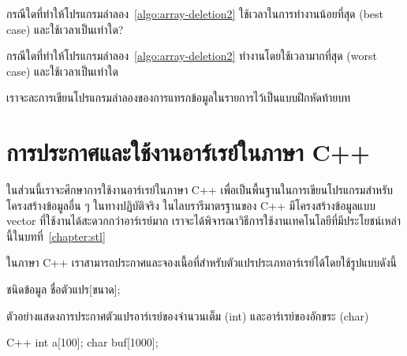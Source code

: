 \begin{quiz}{}
กรณี{\wbr}ใด{\wbr}ที่{\wbr}ทำให้{\wbr}โปรแกรม{\wbr}ลำลอง~\ref{algo:array-deletion2}
ใช้{\wbr}เวลา{\wbr}ใน{\wbr}การ{\wbr}ทำงาน{\wbr}น้อย{\wbr}ที่สุด (best case) และ{\wbr}ใช้{\wbr}เวลา{\wbr}เป็น{\wbr}เท่าใด?
\end{quiz}

\begin{quiz}{}
กรณี{\wbr}ใด{\wbr}ที่{\wbr}ทำให้{\wbr}โปรแกรม{\wbr}ลำลอง~\ref{algo:array-deletion2} ทำงาน{\wbr}โดย{\wbr}ใช้{\wbr}เวลา{\wbr}มาก{\wbr}ที่สุด (worst case)  และ{\wbr}ใช้{\wbr}เวลา{\wbr}เป็น{\wbr}เท่าใด{\wbr}
\end{quiz}

เรา{\wbr}จะ{\wbr}ละ{\wbr}การ{\wbr}เขียน{\wbr}โปรแกรม{\wbr}ลำลอง{\wbr}ของ{\wbr}การ{\wbr}แทรก{\wbr}ข้อมูล{\wbr}ใน{\wbr}รายการ{\wbr}ไว้{\wbr}เป็น{\wbr}แบบฝึกหัด{\wbr}ท้าย{\wbr}บท{\wbr}

\section{การ{\wbr}ประกาศ{\wbr}และ{\wbr}ใช้งาน{\wbr}อาร์{\wbr}เรย์{\wbr}ใน{\wbr}ภาษา C++}
ใน{\wbr}ส่วน{\wbr}นี้{\wbr}เรา{\wbr}จะ{\wbr}ศึกษา{\wbr}การ{\wbr}ใช้งาน{\wbr}อาร์{\wbr}เรย์{\wbr}ใน{\wbr}ภาษา C++ เพื่อ{\wbr}เป็น{\wbr}พื้นฐาน{\wbr}ใน{\wbr}การ{\wbr}เขียน{\wbr}โปรแกรม{\wbr}สำหรับ{\wbr}โครงสร้าง{\wbr}ข้อมูล{\wbr}อื่น ๆ 
ใน{\wbr}ทาง{\wbr}ปฏิบัติ{\wbr}จริง ใน{\wbr}ไลบรารี{\wbr}มาตรฐาน{\wbr}ของ C++ มี{\wbr}โครงสร้าง{\wbr}ข้อมูล{\wbr}แบบ {\ct vector}
ที่{\wbr}ใช้งาน{\wbr}ได้{\wbr}สะดวก{\wbr}กว่า{\wbr}อาร์{\wbr}เรย์{\wbr}มาก{\wbr}
เรา{\wbr}จะ{\wbr}ได้{\wbr}พิจารณา{\wbr}วิธีการ{\wbr}ใช้งาน{\wbr}เทคโนโลยี{\wbr}ที่{\wbr}มี{\wbr}ประโยชน์{\wbr}เหล่า{\wbr}นี้{\wbr}ใน{\wbr}บท{\wbr}ที่~\ref{chapter:stl}

ใน{\wbr}ภาษา C++
เรา{\wbr}สามารถ{\wbr}ประกาศ{\wbr}และ{\wbr}จอง{\wbr}เนื้อที่{\wbr}สำหรับ{\wbr}ตัวแปร{\wbr}ประเภท{\wbr}อาร์{\wbr}เรย์{\wbr}ได้{\wbr}โดย{\wbr}ใช้{\wbr}รูปแบบ{\wbr}ดังนี้{\wbr}

\begin{center}
ชนิด{\wbr}ข้อมูล ชื่อ{\wbr}ตัวแปร[ขนาด];
\end{center}

ตัวอย่าง{\wbr}แสดง{\wbr}การ{\wbr}ประกาศ{\wbr}ตัวแปร{\wbr}อาร์{\wbr}เรย์{\wbr}ของ{\wbr}จำนวน{\wbr}เต็ม ({\ct int})
และ{\wbr}อาร์{\wbr}เรย์{\wbr}ของ{\wbr}อักขระ ({\ct char})

\latintext
\begin{codelist}{C++}{}
int a[100];
char buf[1000];
\end{codelist}
\thaitext

